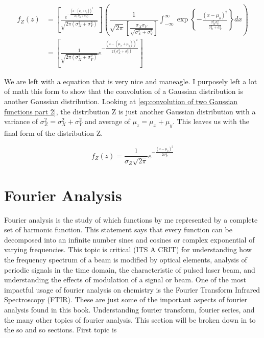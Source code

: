 \documentclass[11pt,a4paper]{book}
\begin{document}
		\begin{equation}
			\label{eq:convolution of two Gaussian functions part 2}
			\begin{split}
			f_Z(z) & = \left[
					\frac{e^{-\frac{\left(z-(\mu_x + \mu_y)\right)^2}{2( \sigma_X^2 + \sigma_Y^2)}}}{\sqrt{2 \pi(\sigma_X^2 + \sigma_Y^2)}}
				\right]
				\left(				
					\dfrac{1}{\sqrt{2 \pi}
					\left[ 
						\frac{\sigma_X \sigma_Y}{\sqrt{\sigma_X^2+\sigma_Y^2}}
					\right]}
					\int_{-\infty}^{\infty}\exp{\left\{-\frac{(x-\mu_o)^2}{\frac{\sigma_X^2 \sigma_Y^2}{\sigma_X^2+\sigma_Y^2}}\right\}}dx
				\right) \\
			& = 
			\left[
				\frac{1}{\sqrt{2 \pi(\sigma_X^2 + \sigma_Y^2)}}
				e^{-\frac{\left(z-(\mu_x + \mu_y)\right)^2}{2( \sigma_X^2 + \sigma_Y^2)}}
			\right]
			\end{split} 
		\end{equation}
		
		We are left with a equation that is very nice and maneagle. I purposely left a lot of math this form to show that the convolution of a Gaussian distribution is another Gaussian distribution. Looking at \autoref{eq:convolution of two Gaussian functions part 2}, the distribution Z is just another Gaussian distribution with a variance of $\sigma_Z^2 = \sigma_X^2 + \sigma_Y^2$ and average of $\mu_z = \mu_x + \mu_y$. This leaves us with the final form of the distribution Z.
		
		\begin{equation}
			f_Z(z) = \dfrac{1}{\sigma_Z \sqrt{2 \pi}} e^{-\frac{\left( z - \mu_z \right)^2}{2 \sigma_Z^2}}
		\end{equation}
		
	\section{Fourier Analysis}
		\label{sec:Fourier Analysis}
		Fourier analysis is the study of which functions by me represented by a complete set of harmonic function. This statement says that every function can be decomposed into an infinite number sines and cosines or complex exponential of varying frequencies.  This topic is critical (ITS A CRIT) for understanding how the frequency spectrum of a beam is modified by optical elements, analysis of periodic signals in the time domain, the characteristic of pulsed laser beam, and understanding the effects of modulation of a signal or beam. One of the most impactful usage of fourier analysis on chemistry is the Fourier Transform Infrared Spectroscopy (FTIR). These are just some of the important aspects of fourier analysis found in this book. Understanding fourier transform, fourier series, and the many other topics of fourier analysis. This section will be broken down in to the so and so sections. First topic is 
		
\end{document}
